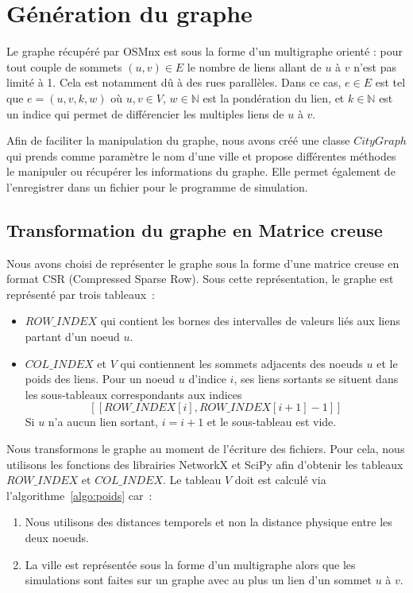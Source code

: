 \section{Génération du graphe}\label{sec:graphe}
Le graphe récupéré par OSMnx est sous la forme d'un multigraphe orienté : pour tout couple de sommets $(u,v)\in E$ le nombre de liens allant de $u$ à $v$ n'est pas limité à 1. Cela est notamment dû à des rues parallèles. Dans ce cas, $e\in E$ est tel que $e=(u,v,k,w)$ où $u,v\in V$, $w\in\mathbb{N}$ est la pondération du lien, et $k\in\mathbb{N}$ est un indice qui permet de différencier les multiples liens de $u$ à $v$.
	
Afin de faciliter la manipulation du graphe, nous avons créé une classe $CityGraph$ qui prends comme paramètre le nom d'une ville et propose différentes méthodes le manipuler ou récupérer les informations du graphe. Elle permet également de l'enregistrer dans un fichier pour le programme de simulation. %

\subsection{Transformation du graphe en Matrice creuse}
Nous avons choisi de représenter le graphe sous la forme d'une matrice creuse en format CSR (Compressed Sparse Row). Sous cette représentation, le graphe est représenté par trois tableaux~: %
\begin{itemize}
	\item $ROW\_INDEX$ qui contient les bornes des intervalles de valeurs liés aux liens partant d'un noeud $u$.
	\item $COL\_INDEX$ et $V$ qui contiennent les sommets adjacents des noeuds $u$ et le poids des liens. Pour un noeud $u$ d'indice $i$, ses liens sortants se situent dans les sous-tableaux correspondants aux indices
	\[[\![ROW\_INDEX[i],ROW\_INDEX[i+1]-1]\!]\]
	Si $u$ n'a aucun lien sortant, $i=i+1$ et le sous-tableau est vide.
\end{itemize}
Nous transformons le graphe au moment de l'écriture des fichiers. Pour cela, nous utilisons les fonctions des librairies NetworkX et SciPy %
	afin d'obtenir les tableaux $ROW\_INDEX$ et $COL\_INDEX$. Le tableau $V$ doit est calculé via l'algorithme~\ref{algo:poids} car~: \begin{enumerate}
	\item Nous utilisons des distances temporels et non la distance physique entre les deux noeuds. %
	\item La ville est représentée sous la forme d'un multigraphe alors que les simulations sont faites sur un graphe avec au plus un lien d'un sommet $u$ à $v$.
\end{enumerate}

